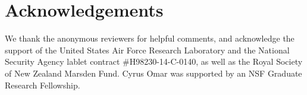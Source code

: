 



\section*{Acknowledgements}
We thank the anonymous reviewers for helpful comments, and acknowledge the support of the United States Air Force Research Laboratory and the National Security Agency lablet contract \#H98230-14-C-0140, as well as the Royal Society of New Zealand Marsden Fund. Cyrus Omar was supported by an NSF Graduate Research Fellowship.
